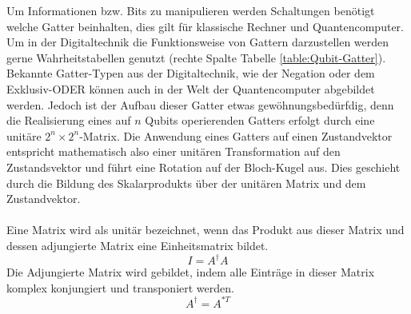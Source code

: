 Um Informationen bzw. Bits zu manipulieren werden Schaltungen ben\"otigt welche Gatter beinhalten, dies gilt f\"ur klassische Rechner und Quantencomputer. Um in der Digitaltechnik die Funktionsweise von Gattern darzustellen werden gerne Wahrheitstabellen genutzt (rechte Spalte Tabelle \ref{table:Qubit-Gatter}). Bekannte Gatter-Typen aus der Digitaltechnik, wie der Negation oder dem Exklusiv-ODER k\"onnen auch in der Welt der Quantencomputer abgebildet werden. Jedoch ist der Aufbau dieser Gatter etwas gew\"ohnungsbed\"urfdig, denn die Realisierung eines auf $n$ Qubits operierenden Gatters erfolgt durch eine unit\"are $2^{n}\times 2^{n}$-Matrix. Die Anwendung eines Gatters auf einen Zustandvektor entspricht mathematisch also einer unit\"aren Transformation auf den Zustandsvektor und f\"uhrt eine Rotation auf der Bloch-Kugel aus. Dies geschieht durch die Bildung des Skalarprodukts \"uber der unit\"aren Matrix und dem Zustandvektor. \\ \\
Eine Matrix wird als unit\"ar bezeichnet, wenn das Produkt aus dieser Matrix und dessen adjungierte Matrix eine Einheitsmatrix bildet.
\begin{equation}
  I = A^{\dagger} A
\end{equation}
Die Adjungierte Matrix wird gebildet, indem alle Eintr\"age in dieser Matrix komplex konjungiert und transponiert werden.
\begin{equation}
  A^{\dagger} = A^{*T}
\end{equation}

